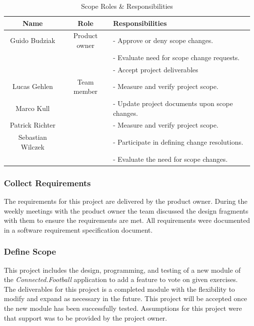 \begin{table}[H]
    \centering
    \begin{tabular}{|c|c|l|}
        \hline
        \cellcolor{gray}Name & 
        \cellcolor{gray}Role &
        \cellcolor{gray}Responsibilities \\\hline
        Guido Budziak & Product owner &- Approve or deny scope changes.\\&&- Evaluate need for scope change requests.\\&&- Accept project deliverables\\\hline
        Lucas Gehlen&Team member&- Measure and verify project scope.\\
        Marco Kull&&- Update project documents upon scope changes.\\
        Patrick Richter&&- Measure and verify project scope.\\
        Sebastian Wilczek&&- Participate in defining change resolutions.\\
        &&- Evaluate the need for scope changes.\\\hline
    \end{tabular}
    \caption{Scope Roles \& Responsibilities}
    \label{tab:scope_roles}
\end{table}

\subsubsection{Collect Requirements}
\label{sssec:collect_requirements}

The requirements for this project are delivered by the product owner. During the weekly meetings with the product owner the team discussed the design fragments with them to ensure the requirements are met. All requirements were documented in a software requirement specification document.

\subsubsection{Define Scope}
\label{sssec:define_scope}

This project includes the design, programming, and testing of a new module of the \textit{Connected.Football} application to add a feature to vote on given exercises. The deliverables for this project is a completed module with the flexibility to modify and expand as necessary in the future. This project will be accepted once the new module has been successfully tested. Assumptions for this project were that support was to be provided by the project owner.

